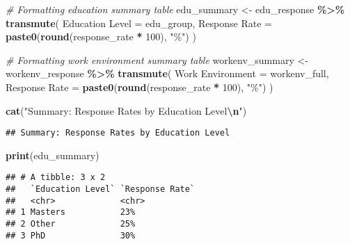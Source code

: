 \documentclass[]{article}
\newenvironment{Shaded}{\begin{snugshade}}{\end{snugshade}}
\newcommand{\AttributeTok}[1]{\textcolor[rgb]{0.13,0.29,0.53}{#1}}
\newcommand{\CommentTok}[1]{\textcolor[rgb]{0.56,0.35,0.01}{\textit{#1}}}
\newcommand{\DecValTok}[1]{\textcolor[rgb]{0.00,0.00,0.81}{#1}}
\newcommand{\FunctionTok}[1]{\textcolor[rgb]{0.13,0.29,0.53}{\textbf{#1}}}
\newcommand{\NormalTok}[1]{#1}
\newcommand{\OtherTok}[1]{\textcolor[rgb]{0.56,0.35,0.01}{#1}}
\newcommand{\SpecialCharTok}[1]{\textcolor[rgb]{0.81,0.36,0.00}{\textbf{#1}}}
\newcommand{\StringTok}[1]{\textcolor[rgb]{0.31,0.60,0.02}{#1}}
\begin{document}
\begin{Shaded}
\begin{Highlighting}[]
\CommentTok{\# Formatting education summary table }
\NormalTok{edu\_summary }\OtherTok{\textless{}{-}}\NormalTok{ edu\_response }\SpecialCharTok{\%\textgreater{}\%}
  \FunctionTok{transmute}\NormalTok{(}
    \StringTok{\textasciigrave{}}\AttributeTok{Education Level}\StringTok{\textasciigrave{}} \OtherTok{=}\NormalTok{ edu\_group,}
    \StringTok{\textasciigrave{}}\AttributeTok{Response Rate}\StringTok{\textasciigrave{}} \OtherTok{=} \FunctionTok{paste0}\NormalTok{(}\FunctionTok{round}\NormalTok{(response\_rate }\SpecialCharTok{*} \DecValTok{100}\NormalTok{), }\StringTok{"\%"}\NormalTok{)}
\NormalTok{  )}

\CommentTok{\# Formatting work environment summary table }
\NormalTok{workenv\_summary }\OtherTok{\textless{}{-}}\NormalTok{ workenv\_response }\SpecialCharTok{\%\textgreater{}\%}
  \FunctionTok{transmute}\NormalTok{(}
    \StringTok{\textasciigrave{}}\AttributeTok{Work Environment}\StringTok{\textasciigrave{}} \OtherTok{=}\NormalTok{ workenv\_full,}
    \StringTok{\textasciigrave{}}\AttributeTok{Response Rate}\StringTok{\textasciigrave{}} \OtherTok{=} \FunctionTok{paste0}\NormalTok{(}\FunctionTok{round}\NormalTok{(response\_rate }\SpecialCharTok{*} \DecValTok{100}\NormalTok{), }\StringTok{"\%"}\NormalTok{)}
\NormalTok{  )}

\FunctionTok{cat}\NormalTok{(}\StringTok{"Summary: Response Rates by Education Level}\SpecialCharTok{\textbackslash{}n}\StringTok{"}\NormalTok{)}
\end{Highlighting}
\end{Shaded}

\begin{verbatim}
## Summary: Response Rates by Education Level
\end{verbatim}

\begin{Shaded}
\begin{Highlighting}[]
\FunctionTok{print}\NormalTok{(edu\_summary)}
\end{Highlighting}
\end{Shaded}

\begin{verbatim}
## # A tibble: 3 x 2
##   `Education Level` `Response Rate`
##   <chr>             <chr>          
## 1 Masters           23%            
## 2 Other             25%            
## 3 PhD               30%
\end{verbatim}
\end{document}
